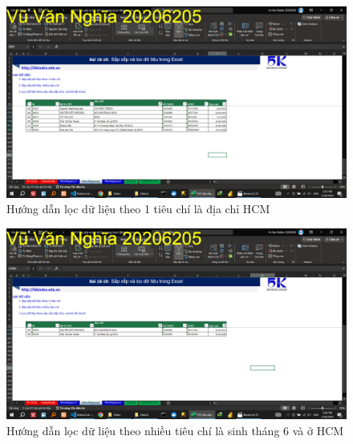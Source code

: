 \documentclass{article}
\begin{document}
\begin{figure}[H]
\centering
\includegraphics[scale = 0.15]{Video2/HuongDan/4.png}
\caption{Hướng dẫn lọc dữ liệu theo 1 tiêu chí là địa chỉ HCM}
\end{figure}

\begin{figure}[H]
\centering
\includegraphics[scale = 0.15]{Video2/HuongDan/5.png}
\caption{Hướng dẫn lọc dữ liệu theo nhiều tiêu chí là sinh tháng 6 và ở HCM}
\end{figure}
\end{document}
